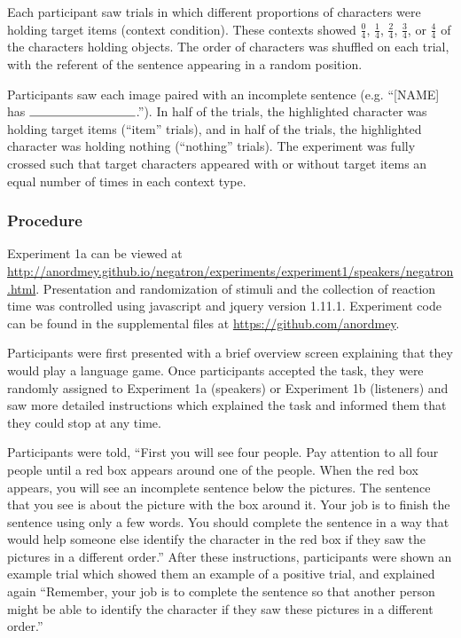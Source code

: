 \documentclass[man, floatsintext, noapacite]{apa6}
\begin{document}
Each participant saw trials in which different proportions of characters were holding target items (context condition).  These contexts showed $\frac{0}{4}$, $\frac{1}{4}$, $\frac{2}{4}$, $\frac{3}{4}$, or $\frac{4}{4}$ of the characters holding objects. The order of characters was shuffled on each trial, with the referent of the sentence appearing in a random position. 

Participants saw each image paired with an incomplete sentence (e.g. ``[NAME] has $\rule{3cm}{0.15mm}$.''). In half of the trials, the highlighted character was holding target items (``item'' trials), and in half of the trials, the highlighted character was holding nothing (``nothing'' trials).  The experiment was fully crossed such that target characters appeared with or without target items an equal number of times in each context type. 

\subsubsection{Procedure}

Experiment 1a can be viewed at \url{http://anordmey.github.io/negatron/experiments/experiment1/speakers/negatron.html}. Presentation and randomization of stimuli and the collection of reaction time was controlled using javascript and jquery version 1.11.1. Experiment code can be found in the supplemental files at  \url{https://github.com/anordmey}.

 Participants were first presented with a brief overview screen explaining that they would play a language game.  Once participants accepted the task, they were randomly assigned to Experiment 1a (speakers) or Experiment 1b (listeners) and saw more detailed instructions which explained the task and informed them that they could stop at any time. 

Participants were told, ``First you will see four people. Pay attention to all four people until a red box appears around one of the people. When the red box appears, you will see an incomplete sentence below the pictures. The sentence that you see is about the picture with the box around it. Your job is to finish the sentence using only a few words. You should complete the sentence in a way that would help someone else identify the character in the red box if they saw the pictures in a different order.'' After these instructions, participants were shown an example trial which showed them an example of a positive trial, and explained again ``Remember, your job is to complete the sentence so that another person might be able to identify the character if they saw these pictures in a different order.''
\end{document}
